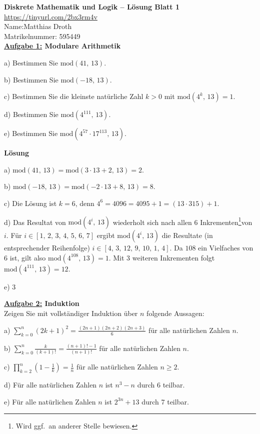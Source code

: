\documentclass[]{article}
\begin{document}
{\Large\bf Diskrete Mathematik und Logik -- Lösung Blatt 1}\\%
\url{https://tinyurl.com/2bx3rm4v}\\
$\text{}$\hspace{12cm}Name:\hspace{1.82cm}Matthias Droth\\
$\text{}$\hspace{12cm}Matrikelnummer: 595449\\
{\bf\underline{Aufgabe 1:} Modulare Arithmetik}\\[-0.8cm]
\begin{list}{}{}
\item[a)]
Bestimmen Sie $\text{mod}(41,\,13)$.
\item[b)]
Bestimmen Sie $\text{mod}(-18,\,13)$.
\item[c)]
Bestimmen Sie die kleinste natürliche Zahl $k>0$ mit $\text{mod}(4^k,\,13)=1$.
\item[d)]
Bestimmen Sie $\text{mod}(4^{111},\,13)$.
\item[e)]
Bestimmen Sie $\text{mod}(4^{57}\cdot17^{113},\,13)$.
\end{list}
{\bf Lösung}\\[-0.8cm]
\begin{list}{}{}
\item[a)]
$\text{mod}(41,\,13)=\text{mod}(3\cdot13+2,\,13)=2$.
\item[b)]
$\text{mod}(-18,\,13)=\text{mod}(-2\cdot13+8,\,13)=8$.
\item[c)]
Die Lösung ist $k=6$, denn $4^6=4096=4095+1=(13\cdot315)+1$.
\item[d)]
Das Resultat von $\text{mod}(4^i,\,13)$ wiederholt sich nach allen 6 Inkrementen\footnote{Wird ggf.~an anderer Stelle bewiesen.}von $i$. Für $i\in[1,\,2,\,3,\,4,\,5,\,6,\,7]$ ergibt $\text{mod}(4^i,\,13)$ die Resultate (in entsprechender Reihenfolge) $i\in[4,\,3,\,12,\,9,\,10,\,1,\,4]$. Da $108$ ein Vielfaches von $6$ ist, gilt also $\text{mod}(4^{108},\,13)=1$. Mit 3 weiteren Inkrementen folgt $\text{mod}(4^{111},\,13)=12$.
\item[e)]
3
\end{list}
{\bf\underline{Aufgabe 2:} Induktion}\\[+0.3cm]
Zeigen Sie mit vollständiger Induktion über $n$ folgende Aussagen:\\[-0.8cm]
\begin{list}{}{}
\item[a)]
$\sum_{k=0}^n(2k{+}1)^2=\frac{(2n+1)(2n+2)(2n+3)}{6}$ für alle natürlichen Zahlen $n$.
\item[b)]
$\sum_{k=0}^n\frac{k}{(k+1)!}=\frac{(n+1)!-1}{(n+1)!}$ für alle natürlichen Zahlen $n$.
\item[c)]
$\prod_{k=2}^n\left(1-\frac{1}{k}\right)=\frac{1}{n}$ für alle natürlichen Zahlen $n\geq2$.
\item[d)]
Für alle natürlichen Zahlen $n$ ist $n^3-n$ durch 6 teilbar.
\item[e)]
Für alle natürlichen Zahlen $n$ ist $2^{3n}+13$ durch 7 teilbar.
\end{list}
\end{document}
